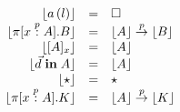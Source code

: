 \begin{figure}

\begin{center}
\begin{math}
\begin{array}{rclr}
\lfloor a\,(l) \rfloor
&=&
\square
\\

\lfloor \pi [x \stackrel{p}{:} A]. B \rfloor
&=&
\lfloor A \rfloor \stackrel{p}{\rightarrow} \lfloor B \rfloor
\\

\lfloor [ A ]_{x} \rfloor
&=&
\lfloor A \rfloor
\\

\lfloor \vec{d} \;\textbf{in}\; A \rfloor
&=&
\lfloor A \rfloor
\\

\lfloor \star \rfloor
&=&
\star
\\

\lfloor \pi [x \stackrel{p}{:} A]. K \rfloor
&=&
\lfloor A \rfloor \stackrel{p}{\rightarrow} \lfloor K \rfloor
\\

\end{array}
\end{math}
\end{center}
\end{figure}

